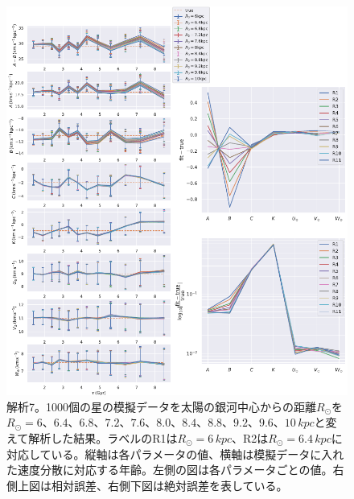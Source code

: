 \begin{figure}[htbp]
	\centering
	\includegraphics[width=15cm]{fig/Mock_R0.pdf}
	\caption{解析7。1000個の星の模擬データを太陽の銀河中心からの距離$R_{\odot}$を$R_{\odot} = 6、6.4、6.8、7.2、7.6、8.0、8.4、8.8、9.2、9.6、10\,\si{kpc}$と変えて解析した結果。ラベルのR1は$R_{\odot}=6\,\si{kpc}$、R2は$R_{\odot}=6.4\,\si{kpc}$に対応している。縦軸は各パラメータの値、横軸は模擬データに入れた速度分散に対応する年齢。左側の図は各パラメータごとの値。右側上図は相対誤差、右側下図は絶対誤差を表している。} \label{fig:Mock_R0}
\end{figure}